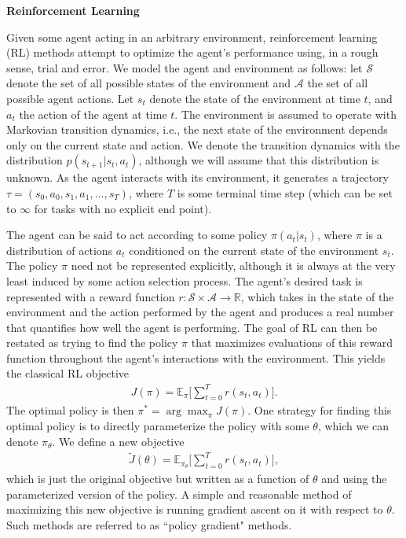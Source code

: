 \documentclass[twoside,10pt]{article}
\newcommand{\subheader}[1]{\bigskip\begin{center}\textbf{#1}\end{center}}
\begin{document}
\subheader{Reinforcement Learning}

Given some agent acting in an arbitrary environment, reinforcement learning (RL) methods attempt to optimize the agent's performance using, in a rough sense, trial and error. We model the agent and environment as follows: let $\mathcal{S}$ denote the set of all possible states of the environment and $\mathcal{A}$ the set of all possible agent actions. Let $s_t$ denote the state of the environment at time $t$, and $a_t$ the action of the agent at time $t$. The environment is assumed to operate with Markovian transition dynamics, i.e., the next state of the environment depends only on the current state and action. We denote the transition dynamics with the distribution $p(s_{t+1} | s_t, a_t)$, although we will assume that this distribution is unknown. As the agent interacts with its environment, it generates a trajectory $\tau = (s_0, a_0, s_1, a_1, \dots, s_T)$, where $T$ is some terminal time step (which can be set to $\infty$ for tasks with no explicit end point).

The agent can be said to act according to some policy $\pi(a_t \vert s_t)$, where $\pi$ is a distribution of actions $a_t$ conditioned on the current state of the environment $s_t$. The policy $\pi$ need not be represented explicitly, although it is always at the very least induced by some action selection process. The agent's desired task is represented with a reward function $r: \mathcal{S} \times \mathcal{A} \to \mathbb{R}$, which takes in the state of the environment and the action performed by the agent and produces a real number that quantifies how well the agent is performing. The goal of RL can then be restated as trying to find the policy $\pi$ that maximizes evaluations of this reward function throughout the agent's interactions with the environment. This yields the classical RL objective
\begin{gather*}
    J(\pi) = \mathbb{E}_{\pi} \Big[ \sum_{t=0}^T r(s_t, a_t) \Big].
\end{gather*}
 The optimal policy is then $\pi^* = \arg\max_\pi J(\pi)$. One strategy for finding this optimal policy is to directly parameterize the policy with some $\theta$, which we can denote $\pi_\theta$. We define a new objective
\begin{gather*}
    \tilde{J}(\theta) = \mathbb{E}_{\pi_\theta} \Big[ \sum_{t=0}^T r(s_t, a_t) \Big],
\end{gather*}
which is just the original objective but written as a function of $\theta$ and using the parameterized version of the policy. A simple and reasonable method of maximizing this new objective is running gradient ascent on it with respect to $\theta$. Such methods are referred to as ``policy gradient" methods.
\end{document}

